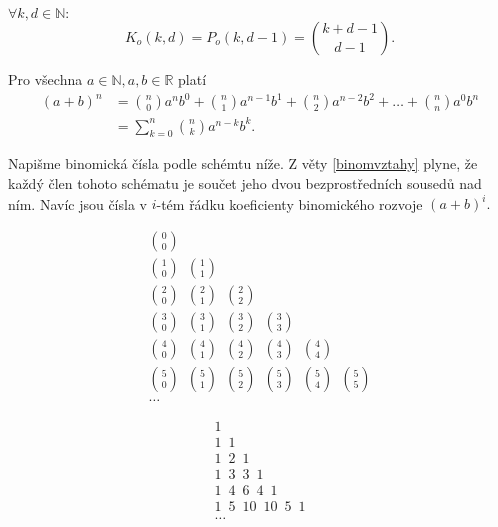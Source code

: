 \begin{veta}
    $\forall k,d \in \mathbb N:$
    $$K_o(k,d)=P_o(k,d-1)=\binom{k+d-1}{d-1}.$$
\end{veta}

\begin{veta}
    Pro všechna $a \in \mathbb N, a,b \in \mathbb R$ platí
    \begin{align*}
        (a+b)^n & = \binom{n}{0}a^nb^0 + \binom{n}{1}a^{n-1}b^1 + \binom{n}{2}
        a^{n-2}b^2 + \dots + \binom{n}{n}a^0b^n \\
        &= \sum_{k=0}^n \binom{n}{k}a^{n-k}b^k.
    \end{align*}
\end{veta}

\begin{pozn}
    Napišme binomická čísla podle schémtu níže. Z věty \ref{binomvztahy} plyne,
    že každý člen tohoto schématu je součet jeho dvou bezprostředních sousedů nad ním.
    Navíc jsou čísla v $i$-tém řádku koeficienty binomického rozvoje $(a+b)^i.$

    \begin{minipage}{0.48\textwidth}
        \begin{gather*}
            \binom{0}{0} \\
            \binom{1}{0} \,\,\, \binom{1}{1} \\
            \binom{2}{0} \,\,\, \binom{2}{1} \,\,\, \binom{2}{2} \\
            \binom{3}{0} \,\,\, \binom{3}{1} \,\,\, \binom{3}{2} \,\,\, \binom{3}{3} \\
            \binom{4}{0} \,\,\, \binom{4}{1} \,\,\, \binom{4}{2} \,\,\, \binom{4}{3} \,\,\, \binom{4}{4} \\
            \binom{5}{0} \,\,\, \binom{5}{1} \,\,\, \binom{5}{2} \,\,\, \binom{5}{3} \,\,\, \binom{5}{4} \,\,\, \binom{5}{5} \\
            \dots
        \end{gather*}
    \end{minipage}
    \hfill
    \begin{minipage}{0.48\textwidth}
    \begin{gather*}
        1 \\
        1 \,\,\, 1 \\
        1 \,\,\, 2 \,\,\, 1 \\
        1 \,\,\, 3 \,\,\, 3 \,\,\, 1 \\
        1 \,\,\, 4 \,\,\, 6 \,\,\, 4 \,\,\, 1 \\
        1 \,\,\, 5 \,\,\, 10 \,\,\, 10 \,\,\, 5 \,\,\, 1 \\
        \dots
    \end{gather*}
    \end{minipage}


\end{pozn}


